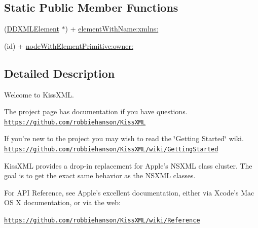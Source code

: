 \subsection*{Static Public Member Functions}
\begin{DoxyCompactItemize}
\item 
(\hyperlink{class_d_d_x_m_l_element}{DDXMLElement} $\ast$) + \hyperlink{class_d_d_x_m_l_element_ae3d8acf51242ab375427beda3db62e5f}{elementWithName:xmlns:}
\item 
(id) + \hyperlink{class_d_d_x_m_l_element_a3968eda63db8b6e150e0647440c6c42a}{nodeWithElementPrimitive:owner:}
\end{DoxyCompactItemize}


\subsection{Detailed Description}
Welcome to KissXML.

The project page has documentation if you have questions. \href{https://github.com/robbiehanson/KissXML}{\tt https://github.com/robbiehanson/KissXML}

If you're new to the project you may wish to read the \char`\"{}Getting Started\char`\"{} wiki. \href{https://github.com/robbiehanson/KissXML/wiki/GettingStarted}{\tt https://github.com/robbiehanson/KissXML/wiki/GettingStarted}

KissXML provides a drop-\/in replacement for Apple's NSXML class cluster. The goal is to get the exact same behavior as the NSXML classes.

For API Reference, see Apple's excellent documentation, either via Xcode's Mac OS X documentation, or via the web:

\href{https://github.com/robbiehanson/KissXML/wiki/Reference}{\tt https://github.com/robbiehanson/KissXML/wiki/Reference} 

